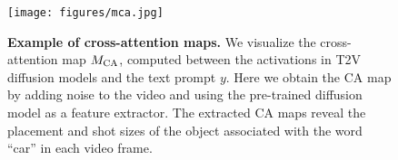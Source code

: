 \begin{figure}[t]
  \centering
  \texttt{[image: figures/mca.jpg]}
  \caption{{\bf Example of cross-attention maps.} We visualize the cross-attention map $M_{{\rm CA}}$, computed between the activations in T2V diffusion models and the text prompt $y$. Here we obtain the CA map by adding noise to the video and using the pre-trained diffusion model as a feature extractor. The extracted CA maps reveal the placement and shot sizes of the object associated with the word ``car'' in each video frame.}
  \label{fig:mca}
\end{figure}